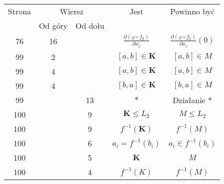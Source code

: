 \documentclass[a4paper,11pt]{article}
\numberwithin{equation}{section}
\begin{document}
\begin{center}
  \newpage

  \begin{tabular}{|c|c|c|c|c|}
    \hline
    Strona & \multicolumn{2}{c|}{Wiersz} & Jest
                              & Powinno być \\ \cline{2-3}
    & Od góry & Od dołu & & \\
    \hline
    76  & 16 & & $\displaystyle \frac{ \partial ( \varphi \circ f_{ 2 } ) }{ \partial x_{ j } }$
           & $\displaystyle \frac{ \partial ( \varphi \circ f_{ 2 } ) }{ \partial x_{ j } }( 0 )$ \\
    99  &  2 & & $[ a, b ] \in \mathbf{K}$ & $[ a, b ] \in M$ \\
    99  &  4 & & $[ a, b ] \in \mathbf{K}$ & $[ a, b ] \in M$ \\
    99  &  4 & & $[ b, a ] \in \mathbf{K}$ & $[ b, a ] \in M$ \\
    99  & & 13 & $*$ & Działanie $*$ \\
    100 & &  9 & $\mathbf{K} \leq L_{ 2 }$ & $M \leq L_{ 2 }$ \\
    100 & &  9 & $f^{ -1 }( \mathbf{K} )$ & $f^{ - 1}( M )$ \\
    100 & &  6 & $a_{ i } = f^{ -1 }( b_{ i } )$
           & $a_{ i } \in f^{ -1 }( b_{ i } )$ \\
    100 & &  5 & $\mathbf{K}$ & $M$ \\
    100 & &  4 & $f^{ -1 }( K )$ & $f^{ -1 }( M )$ \\
    \hline
  \end{tabular}

\end{center}

\VerSpaceTwo
\end{document}
